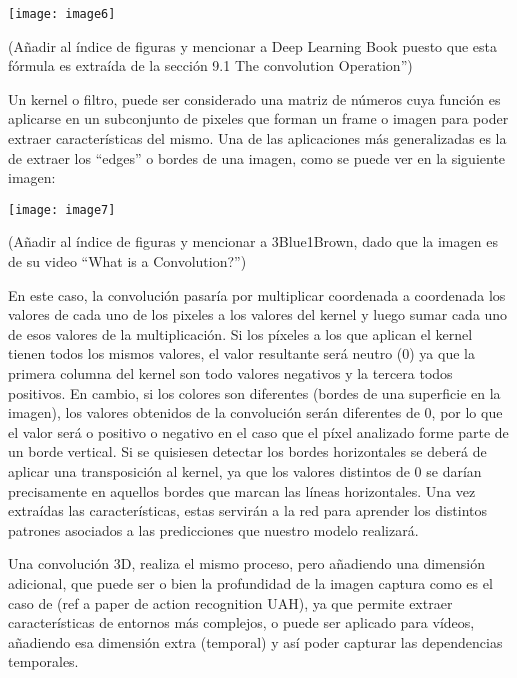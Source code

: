 \documentclass{article} %
\begin{document}
\noindent 

\noindent \texttt{[image: image6]}

\noindent 

\noindent (A\~{n}adir al \'{i}ndice de figuras y mencionar a Deep Learning Book puesto que esta f\'{o}rmula es extra\'{i}da de la secci\'{o}n 9.1 The convolution Operation'')

\noindent 

\noindent Un kernel o filtro, puede ser considerado una matriz de n\'{u}meros cuya funci\'{o}n es aplicarse en un subconjunto de pixeles que forman un frame o imagen para poder extraer caracter\'{i}sticas del mismo. Una de las aplicaciones m\'{a}s generalizadas es la de extraer los ``edges'' o bordes de una imagen, como se puede ver en la siguiente imagen:

\noindent 

\noindent \texttt{[image: image7]}

\noindent 

\noindent (A\~{n}adir al \'{i}ndice de figuras y mencionar a 3Blue1Brown, dado que la imagen es de su video ``What is a Convolution?'')

\noindent 

\noindent En este caso, la convoluci\'{o}n pasar\'{i}a por multiplicar coordenada a coordenada los valores de cada uno de los pixeles a los valores del kernel y luego sumar cada uno de esos valores de la multiplicaci\'{o}n. Si los p\'{i}xeles a los que aplican el kernel tienen todos los mismos valores, el valor resultante ser\'{a} neutro (0) ya que la primera columna del kernel son todo valores negativos y la tercera todos positivos. En cambio, si los colores son diferentes (bordes de una superficie en la imagen), los valores obtenidos de la convoluci\'{o}n ser\'{a}n diferentes de 0, por lo que el valor ser\'{a} o positivo o negativo en el caso que el p\'{i}xel analizado forme parte de un borde vertical. Si se quisiesen detectar los bordes horizontales se deber\'{a} de aplicar una transposici\'{o}n al kernel, ya que los valores distintos de 0 se dar\'{i}an precisamente en aquellos bordes que marcan las l\'{i}neas horizontales. Una vez extra\'{i}das las caracter\'{i}sticas, estas servir\'{a}n a la red para aprender los distintos patrones asociados a las predicciones que nuestro modelo realizar\'{a}.

\noindent 

\noindent Una convoluci\'{o}n 3D, realiza el mismo proceso, pero a\~{n}adiendo una dimensi\'{o}n adicional, que puede ser o bien la profundidad de la imagen captura como es el caso de (ref a paper de action recognition UAH), ya que permite extraer caracter\'{i}sticas de entornos m\'{a}s complejos, o puede ser aplicado para v\'{i}deos, a\~{n}adiendo esa dimensi\'{o}n extra (temporal) y as\'{i} poder capturar las dependencias temporales.
\end{document}
